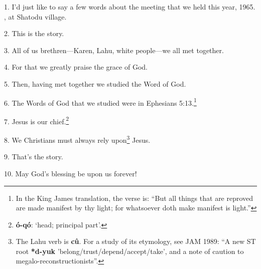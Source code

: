 \setcounter{footnote}{0}

1. I'd just like to say a few words about the meeting that we held this year,
1965. , at Shatodu village.

2. This is the story.

3. All of us brethren---Karen, Lahu, white people---we all met together.

4. For that we greatly praise the grace of God.

5. Then, having met together we studied the Word of God.

6. The Words of God that we studied were in Ephesians 5:13.\footnote{In the King James translation, the verse is: ``But all things that are reproved are made manifest by thy light; for whatsoever doth make manifest is light.''}

7. Jesus is our chief.\footnote{\textbf{ó-qó}: `head; principal part'.}

8. We Christians must always rely upon\footnote{The Lahu verb is \textbf{cû}. For a study of its etymology, see JAM 1989: ``A new ST root \textbf{*d-yuk} 'belong/trust/depend/accept/take', and a note of caution to megalo-reconstructionists''.} Jesus.

9. That's the story.

10. May God's blessing be upon us forever!

